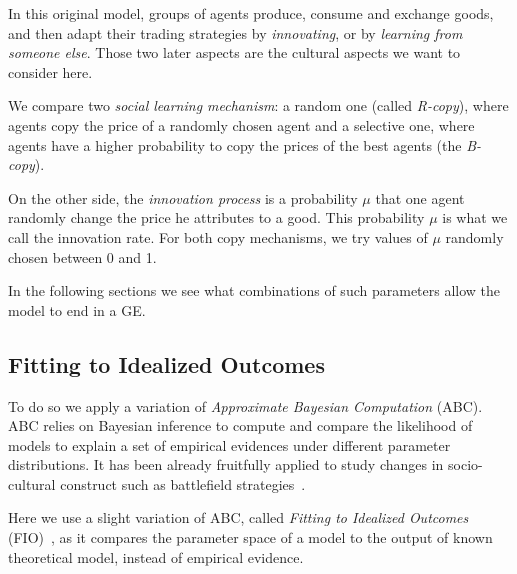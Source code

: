 \documentclass[a1paper,fontscale=.49]{baposter}
\begin{document}
\begin{poster}
{In this original model, groups of agents produce, consume and exchange goods, and then adapt their trading strategies by \emph{innovating}, or by \emph{learning from someone else}. Those two later aspects are the cultural aspects we want to consider here. 

We compare two \emph{social learning mechanism}: a random one (called \emph{R-copy}), where agents copy the price of a randomly chosen agent and a selective one, where agents have a higher probability to copy the prices of the best agents (the \emph{B-copy}).

On the other side, the \emph{innovation process} is a probability $\mu$ that one agent randomly change the price he attributes to a good. This probability $\mu$ is what we call the innovation rate. For both copy mechanisms, we try values of $\mu$ randomly chosen between 0 and 1.

In the following sections we see what combinations of such parameters allow the model to end in a GE.

\subsection*{Fitting to Idealized Outcomes}

To do so we apply a variation of \emph{Approximate Bayesian Computation} (ABC). ABC relies on Bayesian inference to compute and compare the likelihood of models to explain a set of empirical evidences under different parameter distributions. It has been already fruitfully applied to study changes in socio-cultural construct such as battlefield strategies~\cite{rubiocampillo2016modelselectioninhistoricalresearchusingapproximatebayesiancomputation}.

Here we use a slight variation of ABC, called \emph{Fitting to Idealized Outcomes} (FIO)~\cite{gallagher2015transitiontofarmingmorelikelyforsmallconservativegroupswithpropertyrightsbutincreasedproductivityisnotessential}, as it compares the parameter space of a model to the output of known theoretical model, instead of empirical evidence.

}
\end{poster}
\end{document}
